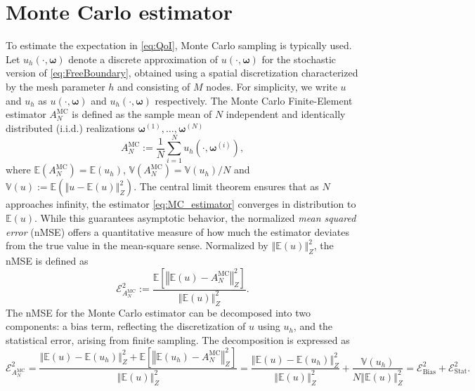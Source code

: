 \section{Monte Carlo estimator}\label{sec:MC}
To estimate the expectation in \eqref{eq:QoI}, Monte Carlo sampling is typically used.  Let $u_h (\cdot, \boldsymbol{\omega})$ denote a discrete approximation of $u(\cdot, \boldsymbol{\omega})$ for the stochastic version of \eqref{eq:FreeBoundary}, obtained using a spatial discretization characterized by the mesh parameter $h$ and consisting of $M$ nodes. For simplicity, we write $u$ and $u_h$ as $u(\cdot,\boldsymbol \omega)$ and $u_h(\cdot,\boldsymbol \omega)$ respectively. The Monte Carlo Finite-Element estimator $A^{\text{MC}}_{N}$ is defined as the sample mean of $N$ independent and identically distributed (i.i.d.) realizations $\boldsymbol{\omega}^{(1)},\ldots,\boldsymbol{\omega}^{(N)}$
%
\begin{equation}\label{eq:MC_estimator}
    A^{\text{MC}}_{N} := \frac{1}{N}\sum_{i=1}^{N} u_{h}\left(\cdot, \boldsymbol{\omega}^{(i)}\right),
\end{equation}
%
where $\mathbb{E}(A^{\text{MC}}_{N}) = \mathbb{E}(u_{h})$, $\mathbb{V}(A^{\text{MC}}_{N}) = \mathbb{V}( u_{h})/{N}$ and $\mathbb{V}(u) := \mathbb{E}\left(\left\Vert u - \mathbb{E}(u)\right\Vert_Z^2\right)$. The central limit theorem ensures that as $N$ approaches infinity, the estimator \eqref{eq:MC_estimator} converges in distribution to $\mathbb{E}(u)$. While this guarantees asymptotic behavior, the normalized \textit{mean squared error} (nMSE) offers a quantitative measure of how much the estimator deviates from the true value in the mean-square sense. Normalized by $\left\Vert\mathbb{E}(u) \right\Vert_{Z}^2$, the nMSE is defined as
%
 \[
\mathcal{E}_{A^{\text{MC}}_{N}}^2:=\frac{\mathbb E\left[\left\Vert\mathbb{E}(u)-A^{\text{MC}}_{N} \right\Vert_{Z}^2\right]}{\left\Vert\mathbb{E}(u) \right\Vert_{Z}^2}.
\] 
%
The nMSE for the Monte Carlo estimator can be decomposed into two components: a bias term, reflecting the discretization of $u$ using $u_h$, and the statistical error, arising from finite sampling. The decomposition is expressed as
%
\[
\mathcal{E}_{A^{\text{MC}}_{N}}^2 = \frac{\left\Vert\mathbb{E}(u)-\mathbb{E}(u_{h}) \right\Vert_{Z}^2+\mathbb E\left[\left\Vert \mathbb{E}(u_{h}) -A^{\text{MC}}_{N} \right\Vert_{Z}^2\right]}{\left\Vert\mathbb{E}(u) \right\Vert_{Z}^2} = \frac{\left\Vert\mathbb{E}(u)-\mathbb{E}(u_{h}) \right\Vert_{Z}^2}{\left\Vert\mathbb{E}(u) \right\Vert_{Z}^2}+\frac{\mathbb{V}\left( u_{h}\right)}{N\left\Vert\mathbb{E}(u) \right\Vert_{Z}^2}=\mathcal{E}_{\text{Bias}}^2 + \mathcal{E}_{\text{Stat}}^2.
\]
